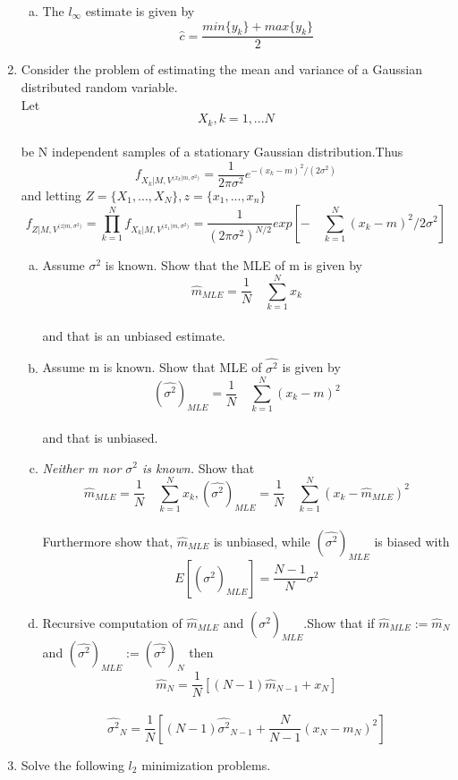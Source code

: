 \documentclass[journal,12pt,twocolumn]{IEEEtran}
\begin{document}
\begin{enumerate}
\begin{enumerate}[(a)]
\item The $l_\infty$ estimate is given by
$$\hat{c}=\frac{min\{{y_k}\}+max\{y_k\}}{2}$$
\end{enumerate}
\item Consider the problem of estimating the mean and variance of a Gaussian distributed random variable.\\

Let
$${X_k}, {k=1},... N$$\\
be N independent samples of a stationary Gaussian distribution.Thus\\
$$f_{{X_k}|{M},{V^{{(x_k}|m,{\sigma^2})}}}=\frac{1}{2\pi\sigma^2}e^{-(x_k-m)^2/(2\sigma^2)}$$
and letting $Z=\{{X_1},...,{X_N}\},z=\{x_1,...,x_n\}$
$$f_{{Z|M},{V^{{(z|m,\sigma^2})}}}=\prod_{k=1}^{N}f_{{X_k}|{M},{V^{{(x_1}|m,{\sigma^2})}}}=\frac{1}{(2\pi\sigma^2)^{N/2}}exp[-\quad\sum_{k=1}^{N}{({x_k}-m)^2}/{2\sigma^2}]$$
\begin{enumerate}[(a)]
\item Assume $\sigma^2$ is known. Show that the MLE of m is given by
$$\hat{m}_{MLE}=\frac{1}{N}\quad\sum_{k=1}^{N}x_{k}$$\\
and that is an unbiased estimate.
\item Assume m is known. Show that MLE of  $\hat{\sigma^2}$ is given by
$$(\hat{\sigma^2})_{MLE}=\frac{1}{N}\quad\sum_{k=1}^{N}({x_k}-m)^2$$\\
and that is unbiased.
\item\textit{Neither m nor $\sigma^2$ is known.} Show that
$$\hat{m}_{MLE}=\frac{1}{N}\quad\sum_{k=1}^{N}x_{k},  (\hat{\sigma^2})_{MLE}=\frac{1}{N}\quad\sum_{k=1}^{N}({x_k}-\hat{m}_{MLE})^2$$\\
Furthermore show that, $\hat{m}_{MLE}$ is unbiased, while $(\hat{\sigma^2})_{MLE}$ is biased with\\
$$E[(\hat{\sigma^2})_{MLE}]=\frac{N-1}{N}\sigma^2$$
\item Recursive computation of $\hat{m}_{MLE}$ and $(\hat{\sigma^2})_{MLE}$.Show that if $\hat{m}_{MLE}:=\hat{m}_{N}$ and $(\hat{\sigma^2})_{MLE}:=(\hat{\sigma^2})_{N}$ then
$$\hat{m}_{N}=\frac{1}{N}[(N-1)\hat{m}_{N-1}+x_{N}]$$\\
$$\hat{\sigma^2}_{N}=\frac{1}{N}[(N-1)\hat{\sigma^2}_{N-1}+\frac{N}{N-1}(x_{N}-m_{N})^2]$$
\end{enumerate}

\item Solve the following $l_2$ minimization problems.


\end{enumerate}
\end{document}
